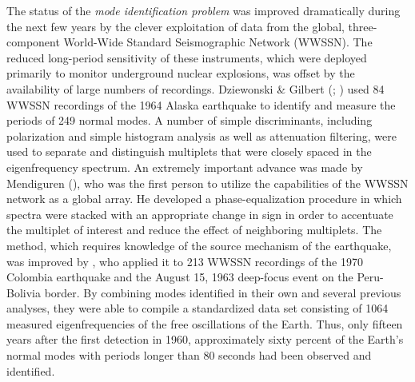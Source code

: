 The status of the
{\em mode identification problem\/}
%
was improved dramatically 
during the next few years by the clever exploitation of
data from the global, three-component World-Wide Standard
Seismographic Network (WWSSN).
%
The reduced
long-period sensitivity of these instruments, which were deployed
primarily to monitor underground nuclear explosions,
was offset by the availability of
large numbers of recordings.  Dziewonski \& Gilbert
(\citeyear{dziewonski&gilbert72}; \citeyear{dziewonski&gilbert73})
used 84 WWSSN recordings of the 1964 Alaska earthquake
%
to identify and measure the periods of 249 normal modes.
A number of simple discriminants, including polarization
and simple histogram analysis as well as attenuation
filtering, were used to separate and distinguish multiplets
that were closely spaced in the eigenfrequency spectrum.
An extremely important advance was made by
Mendiguren (\citeyear{mendiguren73}),
who was the first person to utilize
the capabilities of the WWSSN network as a global array.
%
He developed a phase-equalization procedure in which spectra
were stacked with an appropriate change in sign in order to
accentuate the multiplet of interest and reduce the effect of
neighboring multiplets.  The method, which requires knowledge
of the source mechanism of the earthquake, was improved by
\textcite{gilbert&dziewonski75}, who applied it to 213
WWSSN recordings of the 1970 Colombia earthquake
%
and the
August 15, 1963 deep-focus event on the Peru-Bolivia border.
%
By combining modes identified in their own and several
previous analyses, they were able to compile a standardized
data set consisting of 1064 measured eigenfrequencies of
the free oscillations of the Earth.  Thus, only fifteen years
after the first detection in 1960, approximately sixty percent
of the Earth's normal modes with periods longer than 80 seconds
had been observed and identified.

